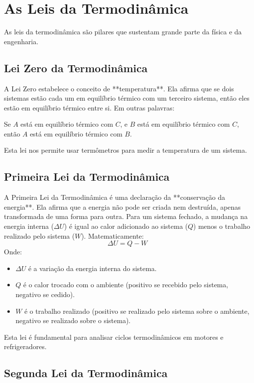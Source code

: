 \documentclass{article}
\begin{document}
\section{As Leis da Termodinâmica}

As leis da termodinâmica são pilares que sustentam grande parte da física e da engenharia.

\subsection{Lei Zero da Termodinâmica}

A Lei Zero estabelece o conceito de **temperatura**. Ela afirma que se dois sistemas estão cada um em equilíbrio térmico com um terceiro sistema, então eles estão em equilíbrio térmico entre si.
Em outras palavras:
\begin{center}
    Se $A$ está em equilíbrio térmico com $C$, e $B$ está em equilíbrio térmico com $C$, então $A$ está em equilíbrio térmico com $B$.
\end{center}
Esta lei nos permite usar termômetros para medir a temperatura de um sistema.

\subsection{Primeira Lei da Termodinâmica}

A Primeira Lei da Termodinâmica é uma declaração da **conservação da energia**. Ela afirma que a energia não pode ser criada nem destruída, apenas transformada de uma forma para outra. Para um sistema fechado, a mudança na energia interna ($\Delta U$) é igual ao calor adicionado ao sistema ($Q$) menos o trabalho realizado pelo sistema ($W$).
Matematicamente:
$$ \Delta U = Q - W $$
Onde:
\begin{itemize}
    \item $\Delta U$ é a variação da energia interna do sistema.
    \item $Q$ é o calor trocado com o ambiente (positivo se recebido pelo sistema, negativo se cedido).
    \item $W$ é o trabalho realizado (positivo se realizado pelo sistema sobre o ambiente, negativo se realizado sobre o sistema).
\end{itemize}
Esta lei é fundamental para analisar ciclos termodinâmicos em motores e refrigeradores.

\subsection{Segunda Lei da Termodinâmica}
\end{document}
